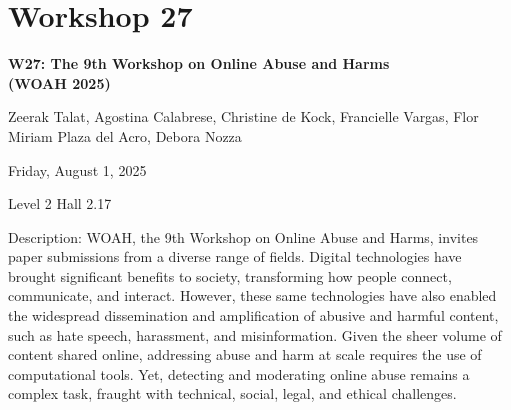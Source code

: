 \clearpage


\section[W27: The 9th Workshop on Online Abuse and Harms (WOAH 2025) ]{Workshop 27}
\label{workshop_27}

\begin{center}
    {\Large \textbf{W27: The 9th Workshop on Online Abuse and Harms\\
    (WOAH 2025) }}\\
    
 \vspace{5mm}

Zeerak Talat, Agostina Calabrese, Christine de Kock, Francielle Vargas, Flor Miriam Plaza del Acro, Debora Nozza\\

 \vspace{5mm}

    Friday, August 1, 2025

Level 2 Hall 2.17

\end{center}

Description: WOAH, the 9th Workshop on Online Abuse and Harms, invites paper submissions from a diverse range of fields. Digital technologies have brought significant benefits to society, transforming how people connect, communicate, and interact. However, these same technologies have also enabled the widespread dissemination and amplification of abusive and harmful content, such as hate speech, harassment, and misinformation. Given the sheer volume of content shared online, addressing abuse and harm at scale requires the use of computational tools. Yet, detecting and moderating online abuse remains a complex task, fraught with technical, social, legal, and ethical challenges. 

